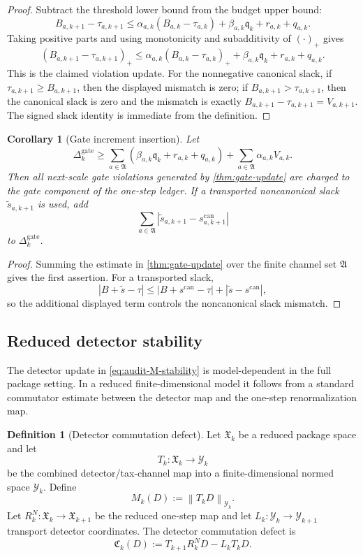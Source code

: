 \documentclass[11pt]{article}
\numberwithin{equation}{section}
\theoremstyle{plain}
\newtheorem{corollary}[theorem]{Corollary}
\theoremstyle{definition}
\newtheorem{definition}[theorem]{Definition}
\theoremstyle{remark}
\newcommand{\gate}{\mathrm{gate}}
\newcommand{\norm}[1]{\left\lVert #1\right\rVert}
\newcommand{\abs}[1]{\left\lvert #1\right\rvert}
\begin{document}
\begin{proof}
Subtract the threshold lower bound from the budget upper bound:
\[
  B_{a,k+1}-\tau_{a,k+1}
  \le
  \alpha_{a,k}(B_{a,k}-\tau_{a,k})
  +\beta_{a,k}\mathfrak q_k+r_{a,k}+q_{a,k}.
\]
Taking positive parts and using monotonicity and subadditivity of
\((\cdot)_+\) gives
\[
  (B_{a,k+1}-\tau_{a,k+1})_+
  \le
  \alpha_{a,k}(B_{a,k}-\tau_{a,k})_+
  +\beta_{a,k}\mathfrak q_k+r_{a,k}+q_{a,k}.
\]
This is the claimed violation update.  For the nonnegative canonical slack,
if \(\tau_{a,k+1}\ge B_{a,k+1}\), then the displayed mismatch is zero; if
\(B_{a,k+1}>\tau_{a,k+1}\), then the canonical slack is zero and the
mismatch is exactly \(B_{a,k+1}-\tau_{a,k+1}=V_{a,k+1}\).  The signed slack
identity is immediate from the definition.
\end{proof}

\begin{corollary}[Gate increment insertion]\label{cor:gate-insertion}
Let
\[
  \Delta_k^{\gate}
  \ge
  \sum_{a\in\mathfrak A}
  \left(
    \beta_{a,k}\mathfrak q_k+r_{a,k}+q_{a,k}
  \right)
  +
  \sum_{a\in\mathfrak A}\alpha_{a,k}V_{a,k}.
\]
Then all next-scale gate violations generated by
\cref{thm:gate-update} are charged to the gate component of the one-step
ledger.  If a transported noncanonical slack \(\widetilde s_{a,k+1}\) is
used, add
\[
  \sum_{a\in\mathfrak A}
  \abs{\widetilde s_{a,k+1}-s_{a,k+1}^{\mathrm{can}}}
\]
to \(\Delta_k^{\gate}\).
\end{corollary}

\begin{proof}
Summing the estimate in \cref{thm:gate-update} over the finite channel set
\(\mathfrak A\) gives the first assertion.  For a transported slack,
\[
  \abs{B+\widetilde s-\tau}
  \le
  \abs{B+s^{\mathrm{can}}-\tau}
  +
  \abs{\widetilde s-s^{\mathrm{can}}},
\]
so the additional displayed term controls the noncanonical slack mismatch.
\end{proof}

\subsection{Reduced detector stability}

The detector update in \eqref{eq:audit-M-stability} is model-dependent in the full
package setting.  In a reduced finite-dimensional model it follows from a
standard commutator estimate between the detector map and the one-step
renormalization map.

\begin{definition}[Detector commutation defect]\label{def:det-comm}
Let \(\mathfrak X_k\) be a reduced package space and let
\[
  T_k:\mathfrak X_k\to\mathcal Y_k
\]
be the combined detector/tax-channel map into a finite-dimensional normed
space \(\mathcal Y_k\).  Define
\[
  M_k(D):=\norm{T_kD}_{\mathcal Y_k}.
\]
Let \(R_k^N:\mathfrak X_k\to\mathfrak X_{k+1}\) be the reduced one-step map
and let \(L_k:\mathcal Y_k\to\mathcal Y_{k+1}\) transport detector
coordinates.  The detector commutation defect is
\[
  \mathfrak C_k(D)
  :=
  T_{k+1}R_k^ND-L_kT_kD.
\]
\end{definition}
\end{document}
